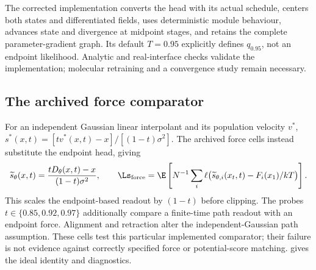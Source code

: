 The corrected implementation converts the head with its actual schedule, centers both states and
differentiated fields, uses deterministic module behaviour, advances state and divergence at
midpoint stages, and retains the complete parameter-gradient graph. Its default $T=0.95$ explicitly
defines $q_{0.95}$, not an endpoint likelihood. Analytic and real-interface checks validate the
implementation; molecular retraining and a convergence study remain necessary.

\subsection{The archived force comparator}
\label{sec:forcebaseline}
For an independent Gaussian linear interpolant and its population velocity $v^*$,
$s^*(x,t)=[tv^*(x,t)-x]/[(1-t)\sigma^2]$. The archived force cells instead substitute the endpoint
head, giving
\begin{equation}
 \widetilde s_\theta(x,t)=\frac{tD_\theta(x,t)-x}{(1-t)\sigma^2},\qquad
 \Ls_{\rm force}=\E\left[N^{-1}\sum_i\ell\bigl(\widetilde s_{\theta,i}(x_t,t)-F_i(x_1)/kT\bigr)\right].
 \label{eq:score}
\end{equation}
This scales the endpoint-based readout by $(1-t)$ before clipping. The probes
$t\in\{0.85,0.92,0.97\}$ additionally compare a finite-time path readout with an endpoint force.
Alignment and retraction alter the independent-Gaussian path assumption. These cells test this
particular implemented comparator; their failure is not evidence against correctly specified force
or potential-score matching.  gives the ideal identity and diagnostics.
